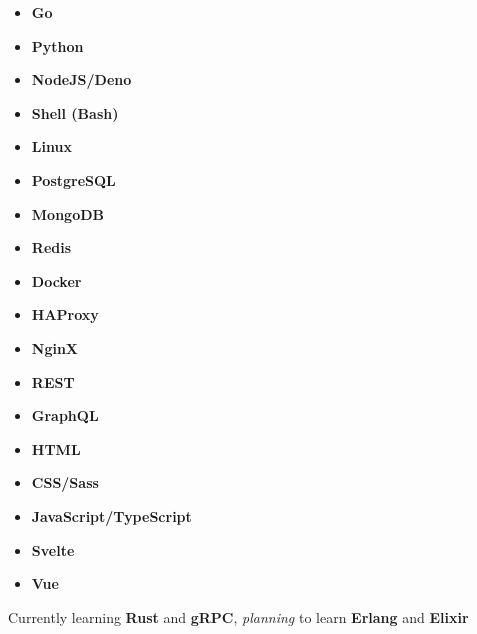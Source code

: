 \documentclass[letterpaper, 10pt]{article}
\begin{document}
\begin{multicols}{3}
	\begin{itemize}
		\item \textbf{Go}
		\item \textbf{Python}
		\item \textbf{NodeJS/Deno}
		\item \textbf{Shell (Bash)}
		\item \textbf{Linux}
		\item \textbf{PostgreSQL}
		\item \textbf{MongoDB}
		\item \textbf{Redis}
		\item \textbf{Docker}
		\item \textbf{HAProxy}
		\item \textbf{NginX}
		\item \textbf{REST}
		\item \textbf{GraphQL}
		\item \textbf{HTML}
		\item \textbf{CSS/Sass}
		\item \textbf{JavaScript/TypeScript}
		\item \textbf{Svelte}
		\item \textbf{Vue}
	\end{itemize}
\end{multicols}

Currently learning \textbf{Rust} and \textbf{gRPC}, \textit{planning} to learn \textbf{Erlang} and \textbf{Elixir}
\end{document}
